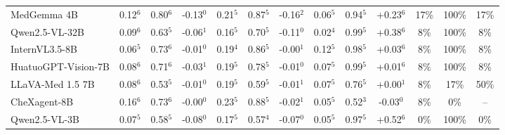 \begin{table}[t]
{\begin{tabular}{l@{\hspace{3pt}}ccc@{\hspace{4pt}}ccc@{\hspace{4pt}}ccc@{\hspace{4pt}}ccc}
MedGemma 4B & \cellcolor{cfSage3}0.12$^{6}$ & \cellcolor{cfSage3}0.80$^{6}$ & \cellcolor{cfSlate3}-0.13$^{0}$ & \cellcolor{cfSage4}0.21$^{5}$ & \cellcolor{cfSage3}0.87$^{5}$ & \cellcolor{cfSlate3}-0.16$^{2}$ & \cellcolor{cfSage2}0.06$^{5}$ & \cellcolor{cfSage4}0.94$^{5}$ & \cellcolor{cfTerra3}+0.23$^{6}$ & \cellcolor{cfTerra3}17\% & \cellcolor{cfTerra4}100\% & 17\% \\
Qwen2.5-VL-32B & \cellcolor{cfSage2}0.09$^{6}$ & \cellcolor{cfSage2}0.63$^{5}$ & \cellcolor{cfSlate2}-0.06$^{1}$ & \cellcolor{cfSage3}0.16$^{5}$ & \cellcolor{cfSage2}0.70$^{5}$ & \cellcolor{cfSlate3}-0.11$^{0}$ & \cellcolor{cfSage1}0.02$^{4}$ & \cellcolor{cfSage4}0.99$^{5}$ & \cellcolor{cfTerra4}+0.38$^{6}$ & \cellcolor{cfTerra2}8\% & \cellcolor{cfTerra4}100\% & 8\% \\
InternVL3.5-8B & \cellcolor{cfSage2}0.06$^{5}$ & \cellcolor{cfSage2}0.73$^{6}$ & \cellcolor{cfSlate1}-0.01$^{0}$ & \cellcolor{cfSage3}0.19$^{4}$ & \cellcolor{cfSage3}0.86$^{5}$ & \cellcolor{cfSlate1}-0.00$^{1}$ & \cellcolor{cfSage2}0.12$^{5}$ & \cellcolor{cfSage4}0.98$^{5}$ & \cellcolor{cfTerra2}+0.03$^{6}$ & \cellcolor{cfTerra2}8\% & \cellcolor{cfTerra4}100\% & 8\% \\
HuatuoGPT-Vision-7B & \cellcolor{cfSage2}0.08$^{6}$ & \cellcolor{cfSage2}0.71$^{6}$ & \cellcolor{cfSlate2}-0.03$^{1}$ & \cellcolor{cfSage3}0.19$^{5}$ & \cellcolor{cfSage3}0.78$^{5}$ & \cellcolor{cfSlate1}-0.01$^{0}$ & \cellcolor{cfSage2}0.07$^{5}$ & \cellcolor{cfSage4}0.99$^{5}$ & \cellcolor{cfTerra1}+0.01$^{6}$ & \cellcolor{cfTerra2}8\% & \cellcolor{cfTerra4}100\% & 8\% \\
LLaVA-Med 1.5 7B & \cellcolor{cfSage2}0.08$^{6}$ & \cellcolor{cfSage1}0.53$^{5}$ & \cellcolor{cfSlate1}-0.01$^{0}$ & \cellcolor{cfSage3}0.19$^{5}$ & \cellcolor{cfSage1}0.59$^{5}$ & \cellcolor{cfSlate1}-0.01$^{1}$ & \cellcolor{cfSage2}0.07$^{5}$ & \cellcolor{cfSage3}0.76$^{5}$ & \cellcolor{cfTerra1}+0.00$^{1}$ & \cellcolor{cfTerra2}8\% & \cellcolor{cfTerra2}17\% & 50\% \\
CheXagent-8B & \cellcolor{cfSage3}0.16$^{6}$ & \cellcolor{cfSage2}0.73$^{6}$ & \cellcolor{cfSlate1}-0.00$^{0}$ & \cellcolor{cfSage4}0.23$^{5}$ & \cellcolor{cfSage3}0.88$^{5}$ & \cellcolor{cfSlate1}-0.02$^{1}$ & \cellcolor{cfSage2}0.05$^{5}$ & \cellcolor{cfSage1}0.52$^{3}$ & \cellcolor{cfSlate2}-0.03$^{0}$ & \cellcolor{cfTerra2}8\% & \cellcolor{cfTerra1}0\% & -- \\
Qwen2.5-VL-3B & \cellcolor{cfSage2}0.07$^{5}$ & \cellcolor{cfSage1}0.58$^{5}$ & \cellcolor{cfSlate2}-0.08$^{0}$ & \cellcolor{cfSage3}0.17$^{5}$ & \cellcolor{cfSage1}0.57$^{4}$ & \cellcolor{cfSlate2}-0.07$^{0}$ & \cellcolor{cfSage1}0.05$^{5}$ & \cellcolor{cfSage4}0.97$^{5}$ & \cellcolor{cfTerra4}+0.52$^{6}$ & \cellcolor{cfTerra1}0\% & \cellcolor{cfTerra4}100\% & 0\% \\

\end{tabular}}
\end{table}

